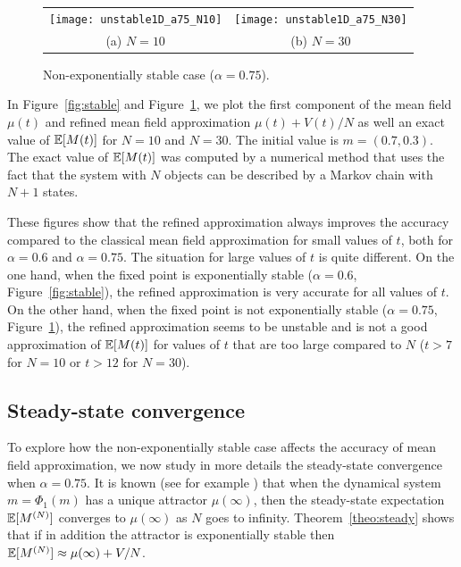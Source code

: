 \documentclass[review]{elsarticle}
\begin{document}
\begin{figure}[ht]
  \centering
  \begin{tabular}{@{}c@{}c@{}}
    \texttt{[image: unstable1D\_a75\_N10]}
    &\texttt{[image: unstable1D\_a75\_N30]}\\[-5pt]
    (a) $N=10$ & (b) $N=30$\vspace{-.3cm}
  \end{tabular}
  \caption{Non-exponentially stable case ($\alpha=0.75$). }
  \label{fig:unstable}
\end{figure}

In Figure~\ref{fig:stable} and Figure~\ref{fig:unstable}, we plot the
first component of the mean field $\mu(t)$ and refined mean field
approximation $\mu(t)+V(t)/N$ as well an exact value of $\esp{M(t)}$
for $N=10$ and $N=30$. The initial value is $m=(0.7,0.3)$. The exact
value of $\esp{M(t)}$ was computed by a numerical method that uses the
fact that the system with $N$ objects can be described by a Markov
chain with $N+1$ states.

These figures show that the refined approximation always improves the
accuracy compared to the classical mean field approximation for small
values of $t$, both for $\alpha=0.6$ and $\alpha=0.75$. The situation
for large values of $t$ is quite different. On the one hand, when the
fixed point is exponentially stable ($\alpha=0.6$,
Figure~\ref{fig:stable}), the refined approximation is very accurate
for all values of $t$. On the other hand, when the fixed point is not
exponentially stable ($\alpha=0.75$, Figure~\ref{fig:unstable}), the
refined approximation seems to be unstable and is not a good
approximation of $\esp{M(t)}$ for values of $t$ that are too large
compared to $N$ ($t>7$ for $N=10$ or $t>12$ for $N=30$).

\subsection{Steady-state convergence}

To explore how the non-exponentially stable case affects the accuracy
of mean field approximation, we now study in more details the
steady-state convergence when $\alpha=0.75$. It is known (see for
example \cite[Corollary~14]{gastgaujalDEDS}) that when the dynamical
system $m=\Phi_1(m)$ has a unique attractor $\mu(\infty)$, then the
steady-state expectation $\esp{\MN}$ converges to $\mu(\infty)$ as $N$
goes to infinity. Theorem~\ref{theo:steady} shows that if in addition
the attractor is exponentially stable then
$\esp{\MN}\approx \mu(\infty)+V/N$.
\end{document}
